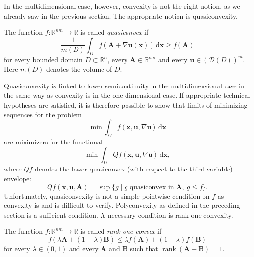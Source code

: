 In the multidimensional case, however, convexity is not the right notion, as we already saw in the previous section. The appropriate notion is quasiconvexity.

\begin{Definition}
\label{def:quasiconvex-function}
The function $f:\mathbb{R}^{nm}\to\mathbb{R}$ is called \emph{quasiconvex} if
\begin{equation}\label{eq:quasiconvex-function-integral-definition}
\dfrac{1}{m(D)}\int_Df(\bm{A}+\nabla\bm{u}(\bm{x}))\,\mathrm{d}\bm{x}\geq f(\bm{A})
\end{equation}
for every bounded domain $D\subset\mathbb{R}^n$, every $\bm{A}\in\mathbb{R}^{nm}$ and every $\bm{u}\in(\mathcal{D}(D))^m$. Here $m(D)$ denotes the volume of $D$.
\end{Definition}

Quasiconvexity is linked to lower semicontinuity in the multidimensional case in the same way as convexity is in the one-dimensional case. If appropriate technical hypotheses are satisfied, it is therefore possible to show that limits of minimizing sequences for the problem
\begin{equation}\label{eq:multidimensional-unrelaxed-variational-problem}
\min\int_\Omega f(\bm{x},\bm{u},\nabla\bm{u})\,\mathrm{d}\bm{x}
\end{equation}
are minimizers for the functional
\begin{equation}\label{eq:multidimensional-quasiconvexified-variational-problem}
\min\int_\Omega Qf(\bm{x},\bm{u},\nabla\bm{u})\,\mathrm{d}\bm{x},
\end{equation}
where $Qf$ denotes the lower quasiconvex (with respect to the third variable) envelope:
\begin{equation}\label{eq:lower-quasiconvex-envelope-definition}
Qf(\bm{x},\bm{u},\bm{A})=\sup\{g\mid g\text{ quasiconvex in }\bm{A},\ g\leq f\}.
\end{equation}
Unfortunately, quasiconvexity is not a simple pointwise condition on $f$ as convexity is and is difficult to verify. Polyconvexity as defined in the preceding section is a sufficient condition. A necessary condition is rank one convexity.

\begin{Definition}
\label{def:rank-one-convex-function}
The function $f:\mathbb{R}^{nm}\to\mathbb{R}$ is called \emph{rank one convex} if
\begin{equation}\label{eq:rank-one-convex-function-definition}
f(\lambda\bm{A}+(1-\lambda)\bm{B})\leq\lambda f(\bm{A})+(1-\lambda)f(\bm{B})
\end{equation}
for every $\lambda\in(0,1)$ and every $\bm{A}$ and $\bm{B}$ such that $\operatorname{rank}(\bm{A}-\bm{B})=1$.
\end{Definition}

